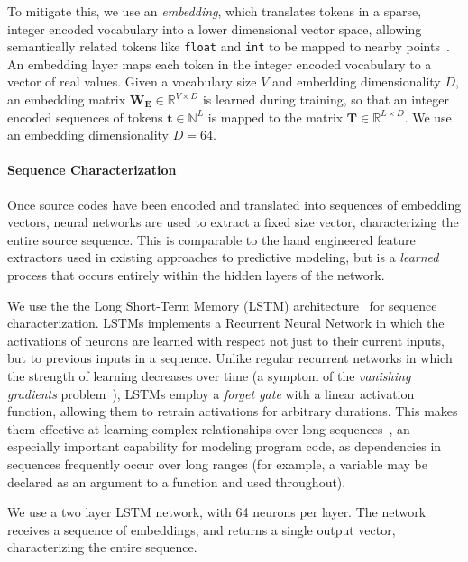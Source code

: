 To mitigate this, we use an \emph{embedding}, which translates tokens in a sparse, integer encoded vocabulary into a lower dimensional vector space, allowing semantically related tokens like \texttt{float} and \texttt{int} to be mapped to nearby points~\cite{Mikolov2013a,Baroni2014}. An embedding layer maps each token in the integer encoded vocabulary to a vector of real values. Given a vocabulary size $V$ and embedding dimensionality $D$, an embedding matrix $\bm{W_{E}} \in \mathbb{R}^{V \times D}$ is learned during training, so that an integer encoded sequences of tokens $\bm{t} \in \mathbb{N}^{L}$ is mapped to the matrix $\bm{T} \in \mathbb{R}^{L \times D}$. We use an embedding dimensionality $D = 64$.

\paragraph{Sequence Characterization} Once source codes have been encoded and translated into sequences of embedding vectors, neural networks are used to extract a fixed size vector, characterizing the entire source sequence. This is comparable to the hand engineered feature extractors used in existing approaches to predictive modeling, but is a \emph{learned} process that occurs entirely within the hidden layers of the network.

We use the the Long Short-Term Memory (LSTM) architecture~\cite{Hochreiter1997} for sequence characterization. LSTMs implements a Recurrent Neural Network in which the activations of neurons are learned with respect not just to their current inputs, but to previous inputs in a sequence. Unlike regular recurrent networks in which the strength of learning decreases over time (a symptom of the \emph{vanishing gradients} problem~\cite{Pacanu2013}), LSTMs employ a \emph{forget gate} with a linear activation function, allowing them to retrain activations for arbitrary durations. This makes them effective at learning complex relationships over long sequences~\cite{Lipton2015}, an especially important capability for modeling program code, as dependencies in sequences frequently occur over long ranges (for example, a variable may be declared as an argument to a function and used throughout).

We use a two layer LSTM network, with 64 neurons per layer. The network receives a sequence of embeddings, and returns a single output vector, characterizing the entire sequence.



